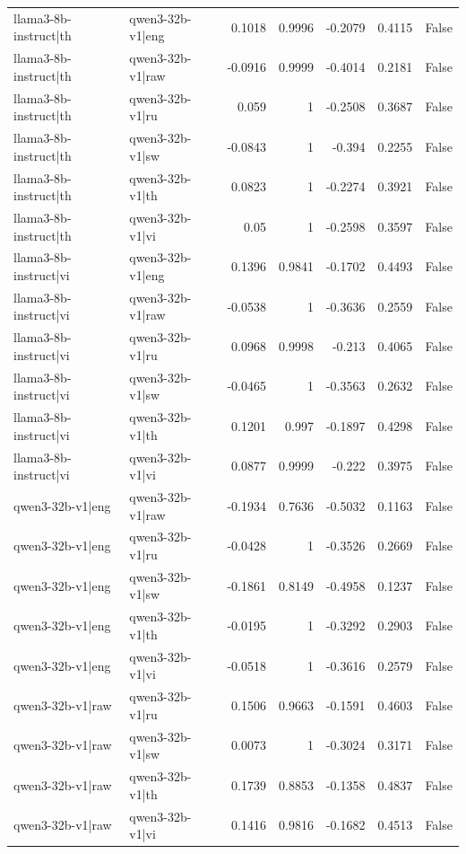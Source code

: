 \begin{table}
\begin{tabular}{l l r r r r l}
llama3-8b-instruct|th & qwen3-32b-v1|eng & 0.1018 & 0.9996 & -0.2079 & 0.4115 & False \\
llama3-8b-instruct|th & qwen3-32b-v1|raw & -0.0916 & 0.9999 & -0.4014 & 0.2181 & False \\
llama3-8b-instruct|th & qwen3-32b-v1|ru & 0.059 & 1 & -0.2508 & 0.3687 & False \\
llama3-8b-instruct|th & qwen3-32b-v1|sw & -0.0843 & 1 & -0.394 & 0.2255 & False \\
llama3-8b-instruct|th & qwen3-32b-v1|th & 0.0823 & 1 & -0.2274 & 0.3921 & False \\
llama3-8b-instruct|th & qwen3-32b-v1|vi & 0.05 & 1 & -0.2598 & 0.3597 & False \\
llama3-8b-instruct|vi & qwen3-32b-v1|eng & 0.1396 & 0.9841 & -0.1702 & 0.4493 & False \\
llama3-8b-instruct|vi & qwen3-32b-v1|raw & -0.0538 & 1 & -0.3636 & 0.2559 & False \\
llama3-8b-instruct|vi & qwen3-32b-v1|ru & 0.0968 & 0.9998 & -0.213 & 0.4065 & False \\
llama3-8b-instruct|vi & qwen3-32b-v1|sw & -0.0465 & 1 & -0.3563 & 0.2632 & False \\
llama3-8b-instruct|vi & qwen3-32b-v1|th & 0.1201 & 0.997 & -0.1897 & 0.4298 & False \\
llama3-8b-instruct|vi & qwen3-32b-v1|vi & 0.0877 & 0.9999 & -0.222 & 0.3975 & False \\
qwen3-32b-v1|eng & qwen3-32b-v1|raw & -0.1934 & 0.7636 & -0.5032 & 0.1163 & False \\
qwen3-32b-v1|eng & qwen3-32b-v1|ru & -0.0428 & 1 & -0.3526 & 0.2669 & False \\
qwen3-32b-v1|eng & qwen3-32b-v1|sw & -0.1861 & 0.8149 & -0.4958 & 0.1237 & False \\
qwen3-32b-v1|eng & qwen3-32b-v1|th & -0.0195 & 1 & -0.3292 & 0.2903 & False \\
qwen3-32b-v1|eng & qwen3-32b-v1|vi & -0.0518 & 1 & -0.3616 & 0.2579 & False \\
qwen3-32b-v1|raw & qwen3-32b-v1|ru & 0.1506 & 0.9663 & -0.1591 & 0.4603 & False \\
qwen3-32b-v1|raw & qwen3-32b-v1|sw & 0.0073 & 1 & -0.3024 & 0.3171 & False \\
qwen3-32b-v1|raw & qwen3-32b-v1|th & 0.1739 & 0.8853 & -0.1358 & 0.4837 & False \\
qwen3-32b-v1|raw & qwen3-32b-v1|vi & 0.1416 & 0.9816 & -0.1682 & 0.4513 & False \\

\end{tabular}
\end{table}
